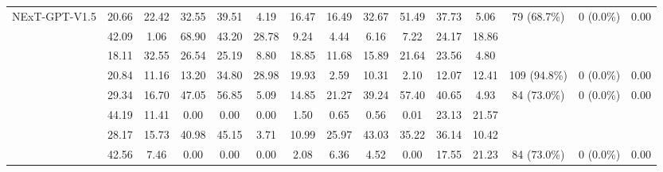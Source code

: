 \documentclass[letterpaper]{article} %
\begin{document}
{\begin{table}[t!]
\begin{tabular}{p{2.2cm} ccccccccccc cc c}
\multirow{2}{*}{NExT-GPT-V1.5} & 20.66 	&	22.42 	&	32.55 	&	39.51 	&	4.19 	&	16.47 	&	16.49 	&	32.67 	&	51.49 	&	37.73 	&	5.06 & \multirow{2}{*}{79 (68.7\%)} & \multirow{2}{*}{0 (0.0\%)} & \multirow{2}{*}{0.00}  \\
& 42.09 	&	1.06 	&	68.90 	&	43.20 	&	28.78 	&	9.24 	&	4.44 	&	6.16 	&	7.22 	&	24.17 	&	18.86  &  &  &   \\
\addlinespace[4pt]

\rowcolor{bg-tb-light-nlp} & 18.11 	&	32.55 	&	26.54 	&	25.19 	&	8.80 	&	18.85 	&	11.68 	&	15.89 	&	21.64 	&	23.56 	&	4.80  &  &  &   \\
\rowcolor{bg-tb-light-nlp} \multirow{-2}{*}{SEED-LLaMA-13B} & 20.84 	&	11.16 	&	13.20 	&	34.80 	&	28.98 	&	19.93 	&	2.59 	&	10.31 	&	2.10 	&	12.07 	&	12.41  & \multirow{-2}{*}{109 (94.8\%)} & \multirow{-2}{*}{0 (0.0\%)} & \multirow{-2}{*}{0.00}  \\
\addlinespace[4pt]

\multirow{2}{*}{LLaMA-Mesh} & 29.34 	&	16.70 	&	47.05 	&	56.85 	&	5.09 	&	14.85 	&	21.27 	&	39.24 	&	57.40 	&	40.65 	&	4.93  & \multirow{2}{*}{84 (73.0\%)} & \multirow{2}{*}{0 (0.0\%)} & \multirow{2}{*}{0.00}  \\
& 44.19 	&	11.41 	&	0.00 	&	0.00 	&	0.00 	&	1.50 	&	0.65 	&	0.56 	&	0.01 	&	23.13 	&	21.57  &  &  &  \\
\addlinespace[4pt]


\rowcolor{bg-tb-light-nlp} & 28.17 	&	15.73 	&	40.98 	&	45.15 	&	3.71 	&	10.99 	&	25.97 	&	43.03 	&	35.22 	&	36.14 	&	10.42  &   &  &  \\
\rowcolor{bg-tb-light-nlp} \multirow{-2}{*}{MiniGPT4-LLaMA2} & 42.56 	&	7.46 	&	0.00 	&	0.00 	&	0.00 	&	2.08 	&	6.36 	&	4.52 	&	0.00 	&	17.55 	&	21.23  &\multirow{-2}{*}{84 (73.0\%)} & \multirow{-2}{*}{0 (0.0\%)} & \multirow{-2}{*}{0.00}  \\


\bottomrule
\end{tabular}%
\vspace{-3mm}
\end{table}
}
\end{document}
